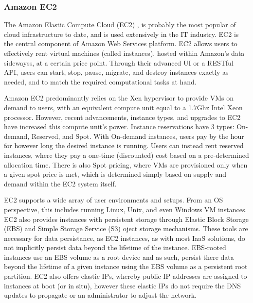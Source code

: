 
\subsubsection{Amazon EC2}


 The Amazon Elastic Compute Cloud (EC2) \cite{EC2}, is probably the most popular of cloud infrastructure to date, and is used extensively in the IT industry. EC2 is the central component of Amazon Web Services platform. EC2 allows users to effectively rent virtual machines (called instances), hosted within Amazon's data sidewayss, at a certain price point. Through their advanced UI or a RESTful API, users can start, stop, pause, migrate, and destroy instances exactly as needed, and to match the required computational tasks at hand.   

Amazon EC2 predominantly relies on the Xen hypervisor to provide VMs on demand to users, with an equivalent compute unit equal to a 1.7Ghz Intel Xeon processor.  However, recent advancements, instance types, and upgrades to EC2 have increased this compute unit's power. Instance reservations have 3 types: On-demand, Reserved, and Spot. With On-demand instances, users pay by the hour for however long the desired instance is running. Users can instead rent reserved instances, where they pay a one-time (discounted) cost based on a pre-determined allocation time. There is also Spot pricing, where VMs are provisioned only when a given spot price is met, which is determined simply based on supply and demand within the EC2 system itself. 

EC2 supports a wide array of user environments and setups. From an OS perspective, this includes running Linux, Unix, and even Windows VM instances. EC2 also provides instances with persistent storage through Elastic Block Storage (EBS) and Simple Storage Service (S3) oject storage mechanisms. These tools are necessary for data persistance, as EC2 instances, as with most IaaS solutions, do not implicitly persist data beyond the lifetime of the instance. EBS-rooted instances use an EBS volume as a root device and as such, persist there data beyond the lifetime of a given instance using the EBS volume as a persistent root partition. EC2 also offers elastic IPs, whereby public IP addresses are assigned to instances at boot (or in situ), however these elastic IPs do not require the DNS updates to propagate or an administrator to adjust the network.  

